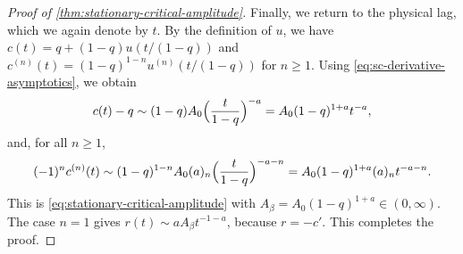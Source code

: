 \begin{proof}[Proof of \cref{thm:stationary-critical-amplitude}]
Finally, we return to the physical lag, which we again denote by $t$. By the definition of $u$, we have $c(t)=q+(1-q)u(t/(1-q))$ and $c^{(n)}(t)=(1-q)^{1-n}u^{(n)}(t/(1-q))$ for $n\ge1$. Using \eqref{eq:sc-derivative-asymptotics}, we obtain
\[
 c(t)-q\sim(1-q)A_0\Bigl(\frac t{1-q}\Bigr)^{-a}=A_0(1-q)^{1+a}t^{-a},
\]
and, for all $n\ge1$,
\[
 (-1)^nc^{(n)}(t)\sim(1-q)^{1-n}A_0(a)_n\Bigl(\frac t{1-q}\Bigr)^{-a-n}=A_0(1-q)^{1+a}(a)_nt^{-a-n}.
\]
This is \eqref{eq:stationary-critical-amplitude} with $A_\beta=A_0(1-q)^{1+a}\in(0,\infty)$. The case $n=1$ gives $r(t)\sim aA_\beta t^{-1-a}$, because $r=-c'$. This completes the proof.
\end{proof}

